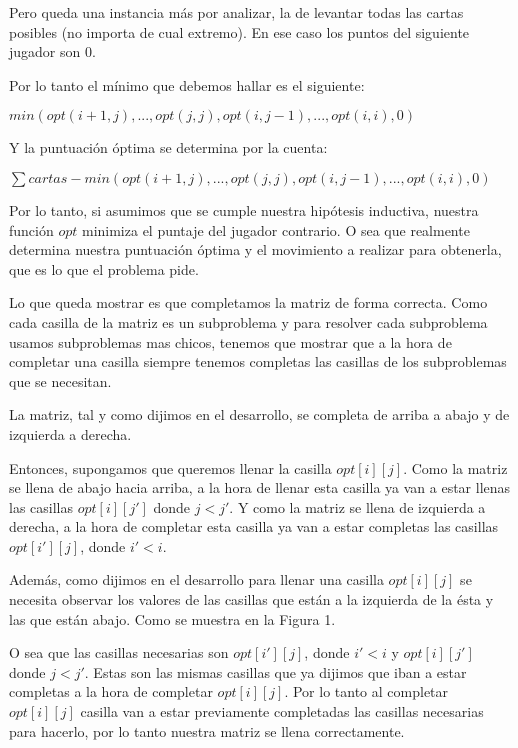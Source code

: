 Pero queda una instancia más por analizar, la de levantar todas las cartas posibles (no importa de cual extremo). En ese caso los puntos del siguiente jugador son 0.

Por lo tanto el mínimo que debemos hallar es el siguiente:

$min(opt(i+1,j), ... , opt(j,j), opt(i,j-1), ... , opt(i,i), 0)$

Y la puntuación óptima se determina por la cuenta:

$\sum cartas - min(opt(i+1,j), ... , opt(j,j), opt(i,j-1), ... , opt(i,i), 0)$

Por lo tanto, si asumimos que se cumple nuestra hipótesis inductiva, nuestra función $opt$ minimiza el puntaje del jugador contrario. O sea que realmente determina nuestra puntuación óptima y el movimiento a realizar para obtenerla, que es lo que el problema pide.

Lo que queda mostrar es que completamos la matriz de forma correcta. Como cada casilla de la matriz es un subproblema y para resolver cada subproblema usamos subproblemas mas chicos, tenemos que mostrar que a la hora de completar una casilla siempre tenemos completas las casillas de los subproblemas que se necesitan.

La matriz, tal y como dijimos en el desarrollo, se completa de arriba a abajo y de izquierda a derecha.

Entonces, supongamos que queremos llenar la casilla $opt[i][j]$. Como la matriz se llena de abajo hacia arriba, a la hora de llenar esta casilla ya van a estar llenas las casillas $opt[i][j']$ donde $j < j'$. Y como la matriz se llena de izquierda a derecha, a la hora de completar esta casilla ya van a estar completas las casillas $opt[i'][j]$, donde $i' < i$.

Además, como dijimos en el desarrollo para llenar una casilla $opt[i][j]$ se necesita observar los valores de las casillas que están a la izquierda de la ésta y las que están abajo. Como se muestra en la Figura 1.

O sea que las casillas necesarias son $opt[i'][j]$, donde $i' < i$ y $opt[i][j']$ donde $j < j'$. Estas son las mismas casillas que ya dijimos que iban a estar completas a la hora de completar $opt[i][j]$. Por lo tanto al completar $opt[i][j]$ casilla van a estar previamente completadas las casillas necesarias para hacerlo, por lo tanto nuestra matriz se llena correctamente.